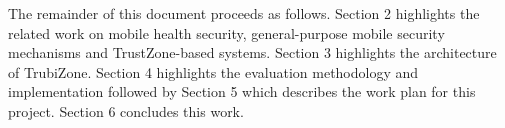 %
%
%
%
The remainder of this document proceeds as follows. Section 2 highlights the related work on mobile health security, general-purpose mobile security mechanisms and TrustZone-based systems. Section 3 highlights the architecture of TrubiZone. Section 4 highlights the evaluation methodology and implementation followed by Section 5 which describes the work plan for this project. Section 6 concludes this work.

